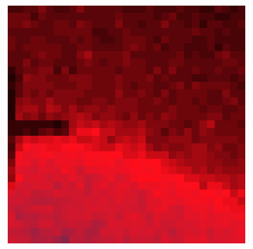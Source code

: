 \documentclass[10pt]{scrartcl}
\begin{document}
\begin{figure}[!ht]
\begin{subfigure}[b]{.3\linewidth}
    \end{subfigure}
    \begin{subfigure}[b]{.3\linewidth}
        \centering
        \includegraphics[width=1.2\linewidth]{../plots_tables_images/1d1dcrop_5_9.eps}
    \end{subfigure}



\end{figure}
\end{document}
